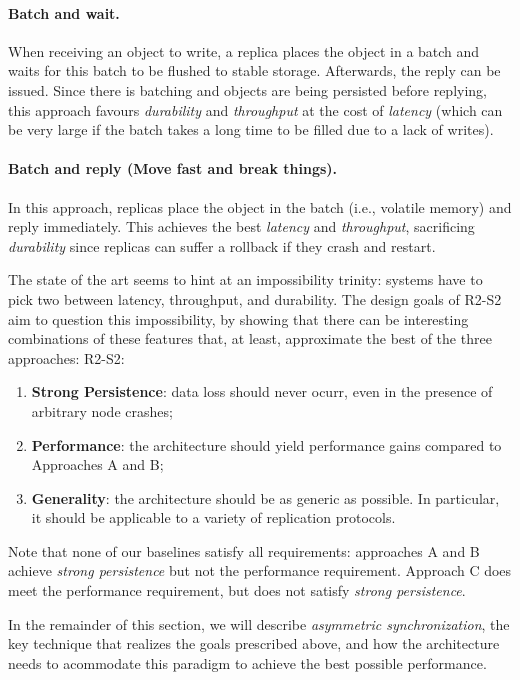 \paragraph{Batch and wait.} When receiving an object to write, a
replica places the object in a batch and waits for this batch to
be flushed to stable storage. Afterwards, the reply can be
issued. Since there is batching and objects are being persisted
before replying, this approach favours \emph{durability} and
\emph{throughput} at the cost of \emph{latency} (which can be
very large if the batch takes a long time to be filled due to a
lack of writes).

\paragraph{Batch and reply (Move fast and break things).} In this approach,
replicas place the object in the batch (i.e., volatile memory)
and reply immediately. This achieves the best \emph{latency} and
\emph{throughput}, sacrificing \emph{durability} since replicas
can suffer a rollback if they crash and restart.

The state of the art seems to hint at
an impossibility trinity: systems have to pick two between latency,
throughput, and durability. The design goals of \ac{R2-S2} aim to question this
impossibility, by showing that there can be interesting
combinations of these features that, at least, approximate the
best of the three approaches:
\ac{R2-S2}:
\begin{enumerate}
    \item \textbf{Strong Persistence}: data loss should never
        ocurr, even in the presence of arbitrary node crashes;

    \item \textbf{Performance}: the architecture should yield
        performance gains compared to
        Approaches A and B\@;
    \item \textbf{Generality}: the architecture should be as
        generic as possible. In particular, it should be
        applicable to a variety of replication protocols.
\fi
\end{enumerate}

Note that none of our baselines satisfy all requirements:
approaches A and B achieve
\emph{strong persistence} but not the performance requirement.
Approach C does meet the performance
requirement, but does not satisfy \emph{strong persistence}.

In the remainder of this section, we will describe
\emph{asymmetric synchronization}, the key technique that realizes the
goals prescribed above, and how the architecture needs to
acommodate this paradigm to achieve the best possible
performance.


